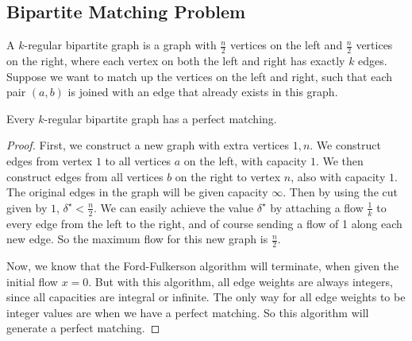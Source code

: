 \subsection{Bipartite Matching Problem}
A \( k \)-regular bipartite graph is a graph with \( \frac{n}{2} \) vertices on the left and \( \frac{n}{2} \) vertices on the right, where each vertex on both the left and right has exactly \( k \) edges.
Suppose we want to match up the vertices on the left and right, such that each pair \( (a,b) \) is joined with an edge that already exists in this graph.
\begin{theorem}
    Every \( k \)-regular bipartite graph has a perfect matching.
\end{theorem}
\begin{proof}
    First, we construct a new graph with extra vertices \( 1, n \).
    We construct edges from vertex \( 1 \) to all vertices \( a \) on the left, with capacity \( 1 \).
    We then construct edges from all vertices \( b \) on the right to vertex \( n \), also with capacity \( 1 \).
    The original edges in the graph will be given capacity \( \infty \).
    Then by using the cut given by \( { 1 } \), \( \delta^\star < \frac{n}{2} \).
    We can easily achieve the value \( \delta^\star \) by attaching a flow \( \frac{1}{k} \) to every edge from the left to the right, and of course sending a flow of 1 along each new edge.
    So the maximum flow for this new graph is \( \frac{n}{2} \).

    Now, we know that the Ford-Fulkerson algorithm will terminate, when given the initial flow \( x = 0 \).
    But with this algorithm, all edge weights are always integers, since all capacities are integral or infinite.
    The only way for all edge weights to be integer values are when we have a perfect matching.
    So this algorithm will generate a perfect matching.
\end{proof}
